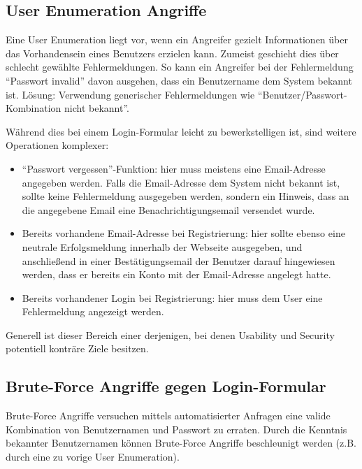 \subsection{User Enumeration Angriffe}

Eine User Enumeration liegt vor, wenn ein Angreifer gezielt Informationen über das Vorhandensein eines Benutzers erzielen kann. Zumeist geschieht dies über schlecht gewählte Fehlermeldungen. So kann ein Angreifer bei der Fehlermeldung ``Passwort invalid'' davon ausgehen, dass ein Benutzername dem System bekannt ist. Lösung: Verwendung generischer Fehlermeldungen wie ``Benutzer/Passwort-Kombination nicht bekannt''.

Während dies bei einem Login-Formular leicht zu bewerkstelligen ist, sind weitere Operationen komplexer:

\begin{itemize}
	\item ``Passwort vergessen''-Funktion: hier muss meistens eine Email-Adresse angegeben werden. Falls die Email-Adresse dem System nicht bekannt ist, sollte keine Fehlermeldung ausgegeben werden, sondern ein Hinweis, dass an die angegebene Email eine Benachrichtigungsemail versendet wurde.
	\item Bereits vorhandene Email-Adresse bei Registrierung: hier sollte ebenso eine neutrale Erfolgsmeldung innerhalb der Webseite ausgegeben, und anschließend in einer Bestätigungsemail der Benutzer darauf hingewiesen werden, dass er bereits ein Konto mit der Email-Adresse angelegt hatte.
	\item Bereits vorhandener Login bei Registrierung: hier muss dem User eine Fehlermeldung angezeigt werden.
\end{itemize}

Generell ist dieser Bereich einer derjenigen, bei denen Usability und Security potentiell konträre Ziele besitzen.

\subsection{Brute-Force Angriffe gegen Login-Formular}

Brute-Force Angriffe versuchen mittels automatisierter Anfragen eine valide Kombination von Benutzernamen und Passwort zu erraten. Durch die Kenntnis bekannter Benutzernamen können Brute-Force Angriffe beschleunigt werden (z.B. durch eine zu vorige User Enumeration).

